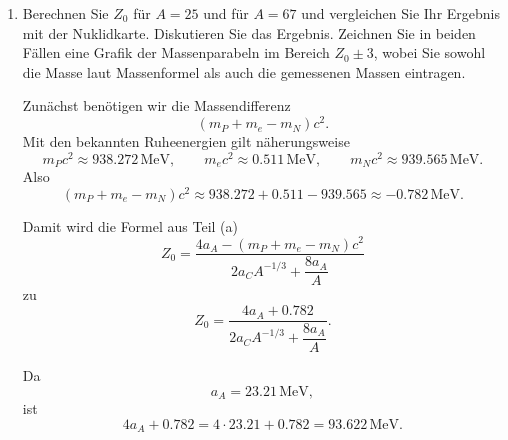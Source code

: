 \documentclass[11pt,a4paper]{scrartcl}
\begin{document}
\begin{enumerate}[label=(\alph*)]
\begin{solutionbox}
        Den letzten Term schreiben wir aus:
        \[
            -4a_A\frac{A-2Z}{A}
            =-4a_A+\frac{8a_A}{A}Z.
        \]

        Somit wird die Gleichung
        \[
            (m_P+m_e-m_N)c^2 + 2a_CZA^{-1/3} -4a_A + \frac{8a_A}{A}Z = 0.
        \]

        Wir sammeln alle $Z$-Terme:
        \[
            Z\left(2a_CA^{-1/3}+\frac{8a_A}{A}\right)
            =4a_A-(m_P+m_e-m_N)c^2.
        \]

        Damit folgt
        \[
            \boxed{
            Z_0=
            \frac{4a_A-(m_P+m_e-m_N)c^2}
            {2a_CA^{-1/3}+\dfrac{8a_A}{A}}
            }.
        \]

        Multipliziert man Zähler und Nenner noch mit $A$, so erhält man die äquivalente Form
        \[
            \boxed{
            Z_0=
            \frac{A\left[4a_A-(m_P+m_e-m_N)c^2\right]}
            {2a_CA^{2/3}+8a_A}
            }.
        \]
    \end{solutionbox}

    \item Berechnen Sie $Z_0$ für $A=25$ und für $A=67$ und vergleichen Sie Ihr Ergebnis mit der Nuklidkarte. Diskutieren Sie das Ergebnis. Zeichnen Sie in beiden Fällen eine Grafik der Massenparabeln im Bereich $Z_0\pm 3$, wobei Sie sowohl die Masse laut Massenformel als auch die gemessenen Massen eintragen.

    \begin{solutionbox}
        Zunächst benötigen wir die Massendifferenz
        \[
            (m_P+m_e-m_N)c^2.
        \]
        Mit den bekannten Ruheenergien gilt näherungsweise
        \[
            m_Pc^2\approx 938.272\,\mathrm{MeV},\qquad
            m_ec^2\approx 0.511\,\mathrm{MeV},\qquad
            m_Nc^2\approx 939.565\,\mathrm{MeV}.
        \]
        Also
        \[
            (m_P+m_e-m_N)c^2
            \approx 938.272+0.511-939.565
            \approx -0.782\,\mathrm{MeV}.
        \]

        Damit wird die Formel aus Teil (a)
        \[
            Z_0=
            \frac{4a_A-(m_P+m_e-m_N)c^2}
            {2a_CA^{-1/3}+\dfrac{8a_A}{A}}
        \]
        zu
        \[
            Z_0=
            \frac{4a_A+0.782}{2a_CA^{-1/3}+\dfrac{8a_A}{A}}.
        \]

        Da
        \[
            a_A=23.21\,\mathrm{MeV},
        \]
        ist
        \[
            4a_A+0.782=4\cdot 23.21+0.782=93.622\,\mathrm{MeV}.
        \]


\end{solutionbox}
\end{enumerate}
\end{document}
